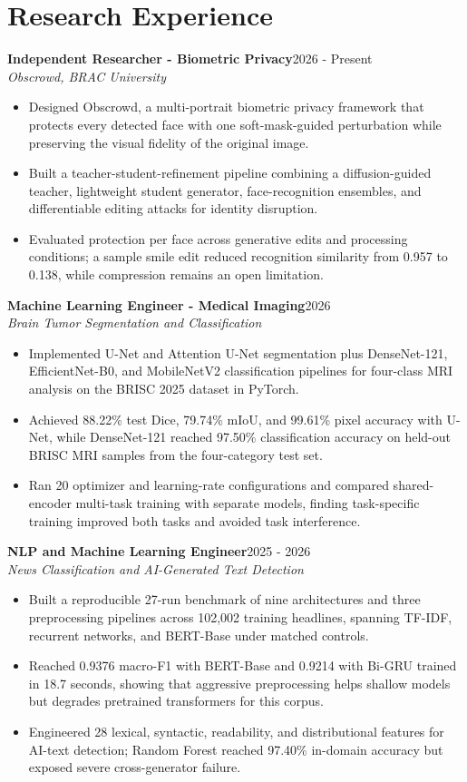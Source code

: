 \documentclass[10pt,a4paper]{article}
\newcommand{\entry}[3]{%
  \textbf{#1}\hfill {\color{gray}#3}\\[-0.08em]
  \textit{#2}\vspace{0.05em}
}
\begin{document}
\section{Research Experience}
\entry{Independent Researcher - Biometric Privacy}{Obscrowd, BRAC University}{2026 - Present}
\begin{itemize}
  \item Designed Obscrowd, a multi-portrait biometric privacy framework that protects every detected face with one soft-mask-guided perturbation while preserving the visual fidelity of the original image.
  \item Built a teacher-student-refinement pipeline combining a diffusion-guided teacher, lightweight student generator, face-recognition ensembles, and differentiable editing attacks for identity disruption.
  \item Evaluated protection per face across generative edits and processing conditions; a sample smile edit reduced recognition similarity from 0.957 to 0.138, while compression remains an open limitation.
\end{itemize}

\entry{Machine Learning Engineer - Medical Imaging}{Brain Tumor Segmentation and Classification}{2026}
\begin{itemize}
  \item Implemented U-Net and Attention U-Net segmentation plus DenseNet-121, EfficientNet-B0, and MobileNetV2 classification pipelines for four-class MRI analysis on the BRISC 2025 dataset in PyTorch.
  \item Achieved 88.22\% test Dice, 79.74\% mIoU, and 99.61\% pixel accuracy with U-Net, while DenseNet-121 reached 97.50\% classification accuracy on held-out BRISC MRI samples from the four-category test set.
  \item Ran 20 optimizer and learning-rate configurations and compared shared-encoder multi-task training with separate models, finding task-specific training improved both tasks and avoided task interference.
\end{itemize}

\entry{NLP and Machine Learning Engineer}{News Classification and AI-Generated Text Detection}{2025 - 2026}
\begin{itemize}
  \item Built a reproducible 27-run benchmark of nine architectures and three preprocessing pipelines across 102,002 training headlines, spanning TF-IDF, recurrent networks, and BERT-Base under matched controls.
  \item Reached 0.9376 macro-F1 with BERT-Base and 0.9214 with Bi-GRU trained in 18.7 seconds, showing that aggressive preprocessing helps shallow models but degrades pretrained transformers for this corpus.
  \item Engineered 28 lexical, syntactic, readability, and distributional features for AI-text detection; Random Forest reached 97.40\% in-domain accuracy but exposed severe cross-generator failure.
\end{itemize}
\end{document}
